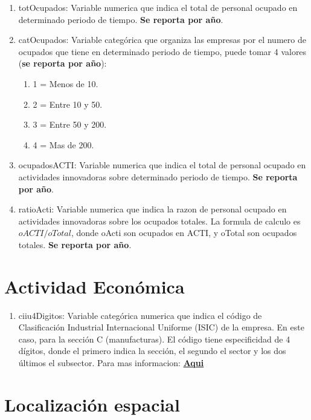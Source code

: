 \documentclass[12pt,a4paper]{article}
\begin{document}
\begin{enumerate}
	\item totOcupados: Variable numerica que indica el total de personal ocupado en determinado periodo de tiempo. \textbf{Se reporta por año}.
	\item catOcupados: Variable categórica que organiza las empresas por el numero de ocupados que tiene en determinado periodo de tiempo, puede tomar 4 valores (\textbf{se reporta por año}):
	\begin{enumerate}
		\item 1 = Menos de 10.
		\item 2 = Entre 10 y 50.
		\item 3 = Entre 50 y 200.
		\item 4 = Mas de 200.
	\end{enumerate}
	\item ocupadosACTI: Variable numerica que indica el total de personal ocupado en actividades innovadoras sobre determinado periodo de tiempo. \textbf{Se reporta por año}.
	\item ratioActi: Variable numerica que indica la razon de personal ocupado en actividades innovadoras sobre los ocupados totales. La formula de calculo es $ oACTI/ oTotal $, donde oActi son ocupados en ACTI, y oTotal son ocupados totales. \textbf{Se reporta por año}.
\end{enumerate}

\section{Actividad Económica}

\begin{enumerate}
	\item ciiu4Digitos: Variable categórica numerica que indica el código de Clasificación Industrial Internacional Uniforme (ISIC) de la empresa. En este caso, para la sección C (manufacturas). El código tiene especificidad de 4 dígitos, donde el primero indica la sección, el segundo el sector y los dos últimos el subsector. Para mas informacion:  \href{https://www.dane.gov.co/files/sen/nomenclatura/ciiu/CIIU_Rev_4_AC2020.pdf}{\textbf{Aqui}}
\end{enumerate}

\section{Localización espacial}
\end{document}
